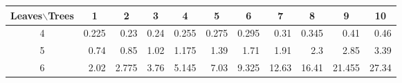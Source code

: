 \begin{tabular}{crrrrrrrrrr}
 \toprule
 Leaves$\backslash$Trees  & \multicolumn{1}{c}{1} & \multicolumn{1}{c}{2} & \multicolumn{1}{c}{3} & \multicolumn{1}{c}{4} & \multicolumn{1}{c}{5} & \multicolumn{1}{c}{6} & \multicolumn{1}{c}{7} & \multicolumn{1}{c}{8} & \multicolumn{1}{c}{9} & \multicolumn{1}{c}{10}\\
 \midrule
 4 & 0.225 & 0.23 & 0.24 & 0.255 & 0.275 & 0.295 & 0.31 & 0.345 & 0.41 & 0.46 \\ 
 5 & 0.74 & 0.85 & 1.02 & 1.175 & 1.39 & 1.71 & 1.91 & 2.3 & 2.85 & 3.39 \\ 
 6 & 2.02 & 2.775 & 3.76 & 5.145 & 7.03 & 9.325 & 12.63 & 16.41 & 21.455 & 27.34 \\ 
\bottomrule 
\end{tabular} 

